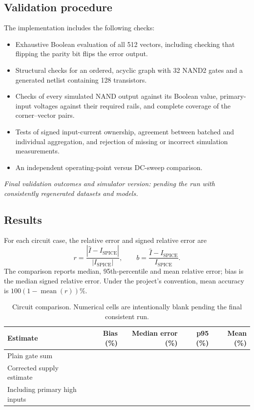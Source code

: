 \documentclass{article}
\begin{document}
\subsection{Validation procedure}
The implementation includes the following checks:
\begin{itemize}
\item Exhaustive Boolean evaluation of all 512 vectors, including checking
      that flipping the parity bit flips the error output.
\item Structural checks for an ordered, acyclic graph with 32 NAND2 gates
      and a generated netlist containing 128 transistors.
\item Checks of every simulated NAND output against its Boolean value,
      primary-input voltages against their required rails, and complete
      coverage of the corner--vector pairs.
\item Tests of signed input-current ownership, agreement between batched
      and individual aggregation, and rejection of missing or incorrect
      simulation measurements.
\item An independent operating-point versus DC-sweep comparison.
\end{itemize}
\noindent\textit{Final validation outcomes and simulator version: pending
the run with consistently regenerated datasets and models.}

\subsection{Results}
For each circuit case, the relative error and signed relative error are
\begin{equation}
r=\frac{|\widehat I-I_{\mathrm{SPICE}}|}{|I_{\mathrm{SPICE}}|},
\qquad
b=\frac{\widehat I-I_{\mathrm{SPICE}}}{I_{\mathrm{SPICE}}}.
\end{equation}
The comparison reports median, 95th-percentile and mean relative error;
bias is the median signed relative error. Under the project's convention,
mean accuracy is $100(1-\operatorname{mean}(r))\%$.

\begin{table}[H]
\centering\small
\begin{tabular}{lrrrr}
\toprule
Estimate & Bias (\%) & Median error (\%) & p95 (\%) & Mean (\%)\\
\midrule
Plain gate sum & & & & \\
Corrected supply estimate & & & & \\
Including primary high inputs & & & & \\
\bottomrule
\end{tabular}
\caption{Circuit comparison. Numerical cells are intentionally blank pending
the final consistent run.}
\label{tab:circuitresults}
\end{table}
\end{document}
